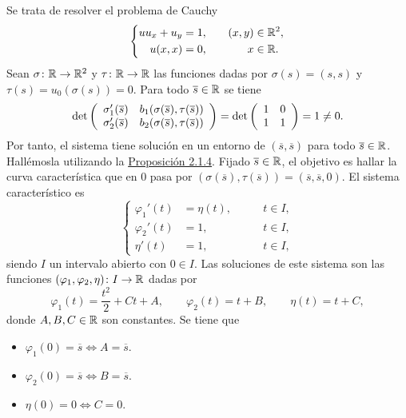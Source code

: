 \documentclass[a4paper, 12pt, extrafontsizes]{memoir}
\begin{document}
\begin{example}
    Se trata de resolver el problema de Cauchy
    \[
    \left\{\begin{alignedat}{3}
        uu_x+u_y &= 1, \qquad & (x,y) &\in \mathbb R^2, \\
        u(x,x) &= 0, \qquad & x &\in \mathbb R.
    \end{alignedat}\right.
    \]
    Sean $\sigma \colon \mathbb R \to \mathbb R^2$ y $\tau \colon \mathbb R \to \mathbb R$ las funciones dadas por $\sigma(s) = (s,s)$ y $\tau(s)=u_0(\sigma(s)) = 0$. Para todo $\overline{s} \in \mathbb R$ se tiene
    \[\textup{det}\left(
        \begin{array}{cc}
            \sigma_1'(\overline{s}) & b_1(\sigma(\overline{s}),\tau(\overline{s})) \\
            \sigma_2'(\overline{s}) & b_2(\sigma(\overline{s}),\tau(\overline{s}))
        \end{array}
    \right) = \textup{det}\left(
        \begin{array}{cc}
            1 & 0 \\
            1 & 1
        \end{array}
    \right) = 1 \neq 0.\]
    Por tanto, el sistema tiene solución en un entorno de $(\overline{s},\overline{s})$ para todo $\overline{s} \in \mathbb R$. Hallémosla utilizando la \hyperref[pro:2.1.4]{\color{gray}Proposición 2.1.4}. Fijado $\overline{s} \in \mathbb R$, el objetivo es hallar la curva característica que en $0$ pasa por $(\sigma(\overline{s}),\tau(\overline{s})) = (\overline{s},\overline{s},0)$. El sistema característico es
    \[
    \left\{\begin{alignedat}{2}
        \varphi_1'(t) &= \eta(t), \qquad & t \in I, \\
        \varphi_2'(t) &= 1, \qquad & t \in I, \\
        \eta'(t) &= 1, \qquad & t \in I,
    \end{alignedat}\right.
    \]
    siendo $I$ un intervalo abierto con $0 \in I$. Las soluciones de este sistema son las funciones $(\varphi_1,\varphi_2,\eta) \colon I \to \mathbb R$ dadas por
    \[\varphi_1(t) = \frac{t^2}{2}+Ct+A, \qquad \varphi_2(t) = t+B, \qquad \eta(t) = t+C,\]
    donde $A,B,C \in \mathbb R$ son constantes. Se tiene que
    \begin{itemize}
        \item $\varphi_1(0)=\overline{s} \iff A = \overline{s}$.
        \item $\varphi_2(0)=\overline{s} \iff B = \overline{s}$.
        \item $\eta(0)=0 \iff C = 0$.

\end{itemize}
\end{example}
\end{document}
